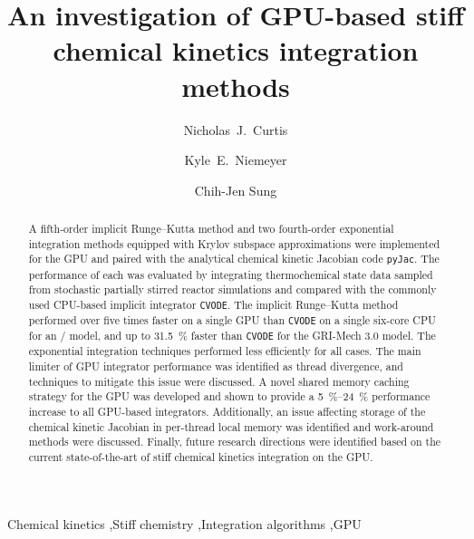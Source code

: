 \documentclass[final,twocolumn]{elsarticle}
\begin{document}
\else
\ifmeasure
\small
\baselineskip 10pt
\fi
\begin{frontmatter}

\title{An investigation of GPU-based stiff chemical kinetics integration methods}

\author[uconn]{Nicholas~J.\ Curtis}
\author[osu]{Kyle~E.\ Niemeyer}
\author[uconn]{Chih-Jen Sung}

\address[uconn]{Department of Mechanical Engineering\\
  University of Connecticut, Storrs, CT, 06269, USA}
\address[osu]{School of Mechanical, Industrial, and Manufacturing Engineering\\
  Oregon State University, Corvallis, OR 97331, USA}
  

\begin{abstract}
A fifth-order implicit Runge--Kutta method and two fourth-order exponential integration methods equipped with Krylov subspace approximations were implemented for the GPU and paired with the analytical chemical kinetic Jacobian code \texttt{pyJac}.
The performance of each was evaluated by integrating thermochemical state data sampled from stochastic partially stirred reactor simulations and compared with the commonly used CPU-based implicit integrator \texttt{CVODE}.
The implicit Runge--Kutta method performed over five times faster on a single GPU than \texttt{CVODE} on a single six-core CPU for an \slash{} model, and up to \SI{31.5}{\percent} faster than \texttt{CVODE} for the GRI-Mech 3.0 model.
The exponential integration techniques performed less efficiently for all cases.
The main limiter of GPU integrator performance was identified as thread divergence, and techniques to mitigate this issue were discussed.
A novel shared memory caching strategy for the GPU was developed and shown to provide a \SIrange{5}{24}{\percent} performance increase to all GPU-based integrators.
Additionally, an issue affecting storage of the chemical kinetic Jacobian in per-thread local memory was identified and work-around methods were discussed.
Finally, future research directions were identified based on the current state-of-the-art of stiff chemical kinetics integration on the GPU.
\end{abstract}

\begin{keyword}
 Chemical kinetics \sep Stiff chemistry \sep Integration algorithms \sep GPU
\end{keyword}

\end{frontmatter}
\end{document}
